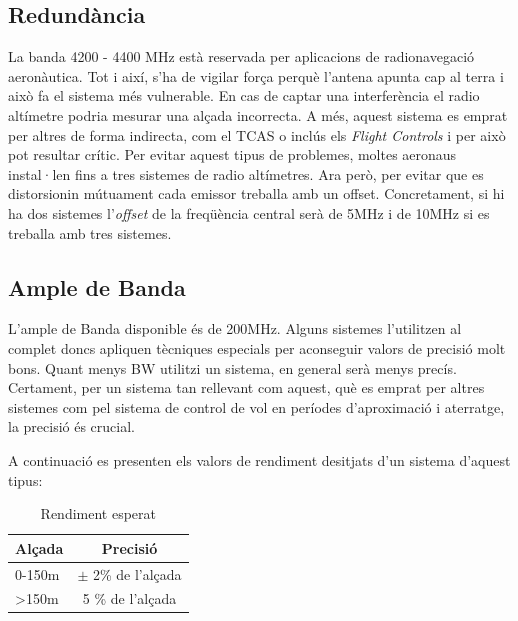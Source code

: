 \subsection{Redundància}
La banda 4200 - 4400 MHz està reservada per aplicacions de radionavegació aeronàutica. Tot i així, s'ha de vigilar força perquè l'antena apunta cap al terra i això fa el sistema més vulnerable. En cas de captar una interferència el radio altímetre podria mesurar una alçada incorrecta. A més, aquest sistema es emprat per altres de forma indirecta, com el TCAS o inclús els \textit{Flight Controls} i per això pot resultar crític.
Per evitar aquest tipus de problemes, moltes aeronaus instal·len fins a tres sistemes de radio altímetres. Ara però, per evitar que es distorsionin mútuament cada emissor treballa amb un offset. Concretament, si hi ha dos sistemes l'\textit{offset} de la freqüència central serà de 5MHz i de 10MHz si es treballa amb tres sistemes.

\subsection{Ample de Banda}
L'ample de Banda disponible és de 200MHz. Alguns sistemes l'utilitzen al complet doncs apliquen tècniques especials per aconseguir valors de precisió molt bons. Quant menys BW utilitzi un sistema, en general serà menys precís. Certament, per un sistema tan rellevant com aquest, què es emprat per altres sistemes com pel sistema de control de vol en períodes d'aproximació i aterratge, la precisió és crucial.

A continuació es presenten els valors de rendiment desitjats d'un sistema d'aquest tipus:
\begin{table}[H]
	\centering
	\begin{tabular}{lc}
		\toprule[3pt]
		\textbf{Alçada}&\textbf{Precisió}\\
		\midrule[1pt]
		0-150m & $\pm$ 2\% de l'alçada \\
		>150m & 5 \% de l'alçada \\
		\bottomrule[2pt]
	\end{tabular}
	\label{C}
	\caption{Rendiment esperat}
\end{table}